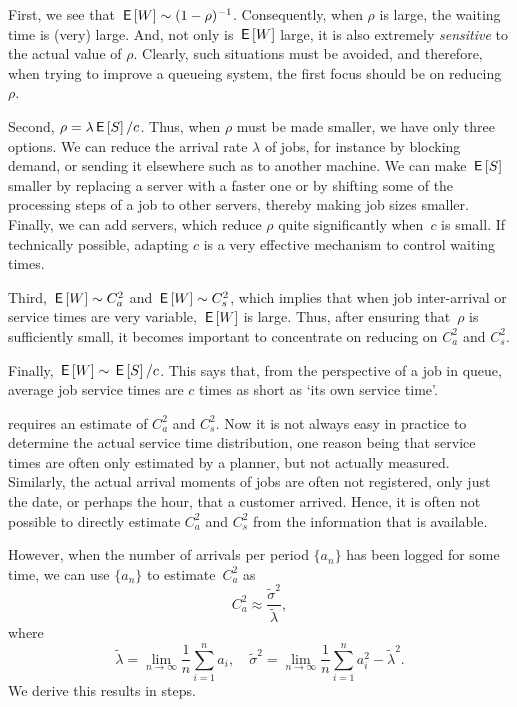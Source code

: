 First, we see that $\,\mathsf{E}\left[W\right] \sim (1-\rho)^{-1}$.
Consequently, when $\rho$ is large, the waiting time is (very) large. And,
not only is $\,\mathsf{E}\left[W\right]$ large, it is also extremely \emph{sensitive} to the actual value of $\rho$.
Clearly, such situations must be avoided, and therefore, when trying to improve a queueing system, the first focus should be on reducing~$\rho$.

Second, $\rho = \lambda \,\mathsf{E}\left[S\right]/c$.
Thus, when $\rho$ must be made smaller, we have only three options.
We can reduce the arrival rate $\lambda$ of jobs, for instance by blocking demand, or sending it elsewhere such as to another machine.
We can make $\,\mathsf{E}\left[S\right]$ smaller by replacing a server with a faster one or by shifting some of the processing steps of a job to other servers, thereby making job sizes smaller.
Finally, we can add servers, which reduce $\rho$ quite significantly when~$c$ is small.
If technically possible, adapting $c$ is a very effective mechanism to control waiting times.

Third, $\,\mathsf{E}\left[W\right] \sim C_a^2$ and $\,\mathsf{E}\left[W\right] \sim C_s^2$, which implies that when job inter-arrival or service times are very variable, $\,\mathsf{E}\left[W\right]$ is large.
Thus, after ensuring that~$\rho$ is sufficiently small, it becomes important to concentrate on reducing on $C_a^2$ and $C_s^2$.

Finally, $\,\mathsf{E}\left[W\right] \sim \,\mathsf{E}\left[S\right]/c$.
This says that, from the perspective of a job in queue, average job service times are $c$ times as short as `its own service time'.


 requires an estimate of $C_a^2$ and $C_s^2$.
Now it is not always easy in practice to determine the actual service time distribution, one reason being that service times are often only estimated by a planner, but not actually measured.
Similarly, the actual arrival moments of jobs are often not registered, only just the date, or perhaps the hour, that a customer arrived.
Hence, it is often not possible to directly estimate $C_a^2$ and $C_s^2$ from the information that is available.

However, when the number of arrivals per period $\{a_n\}$ has been logged for some time, we can use $\{a_n\}$ to estimate~$C_a^2$
as
\begin{equation*}
C_a^2 \approx \frac{\tilde \sigma^2}{\tilde \lambda},
\end{equation*}
where
\begin{equation*}
\tilde \lambda = \lim_{n\to\infty} \frac 1n \sum_{i=1}^n a_i,\quad
\tilde \sigma^2 = \lim_{n\to\infty} \frac 1 n \sum_{i=1}^n a_i^2 - \tilde \lambda^2.
\end{equation*}
We derive this results in steps.


